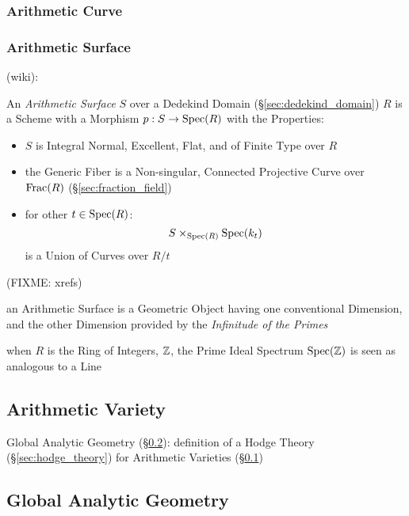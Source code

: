 \subsubsection{Arithmetic Curve}\label{sec:arithmetic_curve}


\subsubsection{Arithmetic Surface}\label{sec:arithmetic_surface}

(wiki):

An \emph{Arithmetic Surface} $S$ over a Dedekind Domain
(\S\ref{sec:dedekind_domain}) $R$ is a Scheme with a Morphism $p : S \rightarrow
\mathrm{Spec}(R)$ with the Properties:
\begin{itemize}
  \item $S$ is Integral Normal, Excellent, Flat, and of Finite Type over $R$
  \item the Generic Fiber is a Non-singular, Connected Projective Curve over
    $\mathrm{Frac}(R)$ (\S\ref{sec:fraction_field})
  \item for other $t \in \mathrm{Spec}(R)$:
    \[
      S \times_{\mathrm{Spec}(R)} \mathrm{Spec}(k_t)
    \]
    is a Union of Curves over $R / t$
\end{itemize}
(FIXME: xrefs)

an Arithmetic Surface is a Geometric Object having one conventional Dimension,
and the other Dimension provided by the \emph{Infinitude of the Primes}

when $R$ is the Ring of Integers, $\mathbb{Z}$, the Prime Ideal Spectrum
$\mathrm{Spec}(\mathbb{Z})$ is seen as analogous to a Line



\subsection{Arithmetic Variety}\label{sec:arithmetic_variety}

Global Analytic Geometry (\S\ref{sec:global_analytic_geometry}): definition of
a Hodge Theory (\S\ref{sec:hodge_theory}) for Arithmetic Varieties
(\S\ref{sec:arithmetic_variety})



\subsection{Global Analytic Geometry}\label{sec:global_analytic_geometry}

